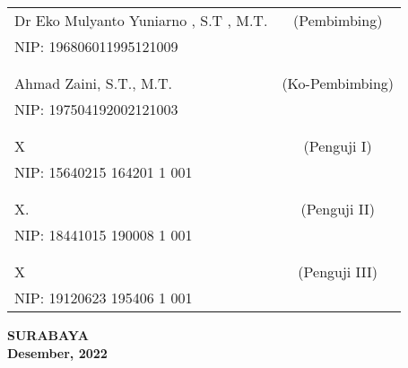     \noindent
    \begin{tabularx}{\textwidth}{X c}
      Dr Eko Mulyanto Yuniarno , S.T , M.T.    & (Pembimbing) \\
      NIP: 196806011995121009        & \\
      &  \\
      &  \\
      Ahmad Zaini, S.T., M.T.     & (Ko-Pembimbing) \\
      NIP: 197504192002121003        & \\
      &  \\
      &  \\
      X  & (Penguji I) \\
      NIP: 15640215 164201 1 001        & \\
      &  \\
      &  \\
      X.  & (Penguji II) \\
      NIP: 18441015 190008 1 001        & \\
      &  \\
      &  \\
      X             & (Penguji III) \\
      NIP: 19120623 195406 1 001        & \\
    \end{tabularx}
  \endgroup

  \vspace{4ex}

  \begin{center}
    \textbf{SURABAYA} \\
    \textbf{Desember, 2022}
  \end{center}
\endgroup
